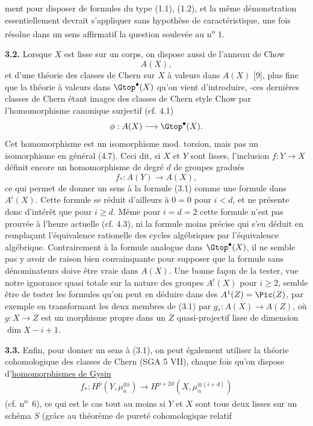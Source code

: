 
ment pour disposer de formules du type (1.1), (1.2), et la même démonstration essentiellement devrait s'appliquer sans hypothèse de caractéristique, une fois résolue dans un sens affirmatif la question soulevée au n\textsuperscript{o} 1.

\textbf{3.2.} Lorsque $X$ est lisse sur un corps, on dispose aussi de l'anneau de Chow
\[
 A(X),
\]
et d'une théorie des classes de Chern sur $X$ à valeurs dans $A(X)$ [9], plus fine que la théorie à valeurs dans $\Gtop^\bullet(X)$ qu'on vient d'introduire, -ces dernières classes de Chern étant images des classes de Chern style Chow par l'homomorphisme canonique surjectif (cf. 4.1)
\[
 \phi:A(X)\longrightarrow \Gtop^\bullet(X).
\]
Cet homomorphisme est un isomorphisme mod. torsion, mais pas un isomorphisme en général (4.7). Ceci dit, si $X$ et $Y$ sont lisses, l'inclusion $f:Y\to X$ définit encore un homomorphisme de degré $d$ de groupes gradués
\[
 f_*:A(Y)\longrightarrow A(X),
\]
ce qui permet de donner un sens à la formule (3.1) comme une formule dans $A^i(X)$. Cette formule se réduit d'ailleurs à $0=0$ pour $i<d$, et ne présente donc d'intérêt que pour $i\geq d$. Même pour $i=d=2$ cette formule n'est pas prouvée à l'heure actuelle (cf. 4.3), ni la formule moins précise qui s'en déduit en remplaçant l'équivalence rationelle des cycles algébriques par l'équivalence algébrique. Contrairement à la formule analogue dans $\Gtop^\bullet(X)$, il ne semble pas y avoir de raison bien convainquante pour supposer que la formule sans dénominateurs doive être vraie dans $A(X)$. Une bonne façon de la tester, vue notre ignorance quasi totale sur la nature des groupes $A^i(X)$ pour $i\geq 2$, semble être de tester les formules qu'on peut en déduire dans des $A^1(Z)=\Pic(Z)$, par exemple en transformant les deux membres de (3.1) par $g_*:A(X)\longrightarrow A(Z)$, où $g:X\to Z$ est un morphisme propre dans un $Z$ quasi-projectif lisse de dimension $\dim X-i+1$.

\textbf{3.3.} Enfin, pour donner un sens à (3.1), on peut également utiliser la théorie cohomologique des classes de Chern (SGA 5 VII), chaque fois qu'on dispose d'\uline{homomorphismes de Gysin}
\[
 f_*:H^p(Y,\mu_n^{\otimes i})\longrightarrow H^{p+2d}(X,\mu_n^{\otimes(i+d)})
\]
(cf. n\textsuperscript{o}~6), ce qui est le cas tout au moins si $Y$ et $X$ sont tous deux lisses sur un schéma $S$ (grâce au théorème de pureté cohomologique relatif 
